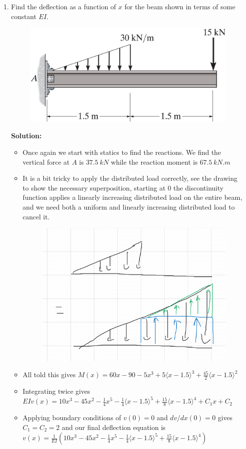 \documentclass[12pt, oneside]{article}
\begin{document}
\begin{enumerate}
	\item %
		Find the deflection as a function of $x$ for the beam shown in terms of some constant $EI$.
		\begin{figure}[H]
			\centering
			\includegraphics[width=0.6\linewidth]{12-39}
		\end{figure}
			\textbf{Solution:}
			\begin{itemize}
				\item Once again we start with statics to find the reactions. We find the vertical force at $A$ is $ 	\SI{37.5}{kN}  $ while the reaction moment is $ 	\SI{67.5}{kN.m}  $
				\item It is a bit tricky to apply the distributed load correctly, see the drawing to show the necessary superposition, starting at 0 the discontinuity function applies a linearly increasing distributed load on the entire beam, and we need both a uniform and linearly increasing distributed load to cancel it.
					\begin{figure}[H]
						\centering
						\includegraphics[width=0.6\linewidth]{12-39a}
					\end{figure}
				\item All told this gives $M(x) = 60x -90 -5x^3 + 5 \langle x-1.5\rangle^3 + \frac{45}{2} \langle x-1.5 \rangle^2$
				\item Integrating twice gives $EI v(x) = 10x^3 - 45x^2 - \frac{1}{4}x^5 - \frac{1}{4} \langle x-1.5 \rangle^5 + \frac{15}{8}\langle x-1.5 \rangle^4 + C_1 x + C_2$
				\item Applying boundary conditions of $v(0) = 0$ and $dv/dx(0) = 0$ gives $C_1 = C_2 = 2$ and our final deflection equation is $v(x) = \frac{1}{EI} \left( 10x^3 - 45x^2 - \frac{1}{4}x^5 - \frac{1}{4} \langle x-1.5 \rangle^5 + \frac{15}{8}\langle x-1.5 \rangle^4 \right)$
			\end{itemize}


\end{enumerate}
\end{document}
